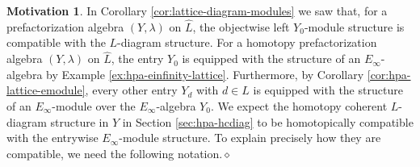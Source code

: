\documentclass{amsbook}
\numberwithin{section}{chapter}
\numberwithin{subsection}{section}
\numberwithin{equation}{section}
\theoremstyle{plain}
\theoremstyle{definition}
\newtheorem{motivation}[equation]{Motivation}
\newcommand{\dqed}{\hfill$\diamond$}
\newcommand{\Lhat}{\widehat{L}}
\begin{document}
\begin{motivation} In Corollary \ref{cor:lattice-diagram-modules} we saw that, for a prefactorization algebra $(Y,\lambda)$ on $\Lhat$, the objectwise left $Y_0$-module structure is compatible with the $L$-diagram structure.  For a homotopy prefactorization algebra $(Y,\lambda)$ on $\Lhat$, the entry $Y_0$ is equipped with the structure of an $E_\infty$-algebra by Example \ref{ex:hpa-einfinity-lattice}.  Furthermore, by Corollary \ref{cor:hpa-lattice-emodule}, every other entry $Y_d$ with $d\in L$ is equipped with the structure of an $E_\infty$-module over the $E_\infty$-algebra $Y_0$.   We expect the homotopy coherent $L$-diagram structure in $Y$ in Section \ref{sec:hpa-hcdiag} to be homotopically compatible with the entrywise $E_\infty$-module structure.  To explain precisely how they are compatible, we need the following notation.\dqed
\end{motivation}
\end{document}
